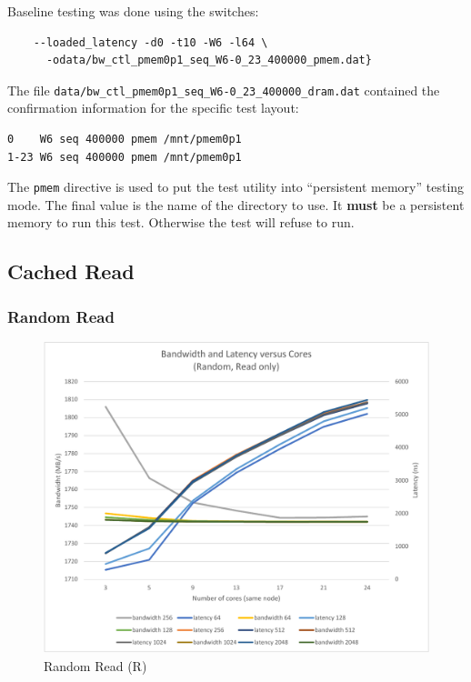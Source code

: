 Baseline testing was done using the switches:

\begin{verbatim}
    --loaded_latency -d0 -t10 -W6 -l64 \
      -odata/bw_ctl_pmem0p1_seq_W6-0_23_400000_pmem.dat}
\end{verbatim}

The file \verb+data/bw_ctl_pmem0p1_seq_W6-0_23_400000_dram.dat+ contained the confirmation information
for the specific test layout:

\begin{verbatim}
0    W6 seq 400000 pmem /mnt/pmem0p1
1-23 W6 seq 400000 pmem /mnt/pmem0p1
\end{verbatim}

The \verb+pmem+ directive is used to put the test utility into ``persistent memory'' testing mode.
The final value is the name of the directory to use.  It \textbf{must} be a persistent memory
to run this test.  Otherwise the test will refuse to run.


\subsection{Cached Read}\label{mlc:r}

\subsubsection{Random Read}
\begin{figure}
    \centering
    \caption{Random Read (R)}\label{chart:random:read}
    \includegraphics[width=1.25\textwidth, trim=3cm 0 0 0]{charts/random-r-crop.pdf}
\end{figure}

